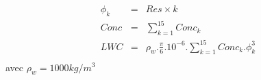 \begin{eqnarray*}
\phi_k & = & Res \times k \\
Conc & = & \sum_{k=1}^{15} Conc_k \\
LWC & = & \rho_w .\frac{\pi}{6}.10^{-6}.
          \sum_{k=1}^{15} Conc_k.\phi^3_k \\
\end{eqnarray*}
avec $\rho_w = 1000 kg/m^3$
